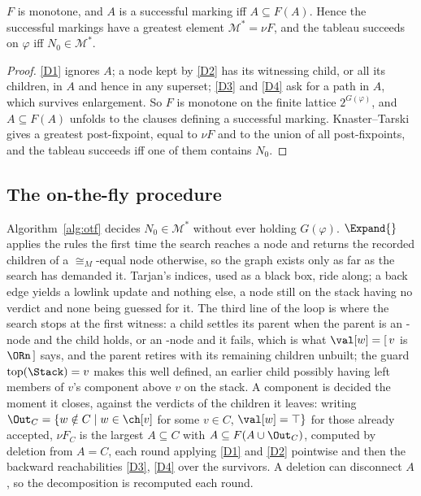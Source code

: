 \begin{proposition}\label{prop:gfp}
$F$ is monotone, and $A$ is a successful marking iff $A\subseteq F(A)$. Hence the successful markings
have a greatest element $\mathcal M^{*}=\nu F$, and the tableau succeeds on $\varphi$ iff
$N_0\in\mathcal M^{*}$.
\end{proposition}
\begin{proof}
\ref{D1} ignores $A$; a node kept by \ref{D2} has its witnessing child, or all its children, in $A$
and hence in any superset; \ref{D3} and \ref{D4} ask for a path in $A$, which survives enlargement.
So $F$ is monotone on the finite lattice $2^{G(\varphi)}$, and $A\subseteq F(A)$ unfolds to the
clauses defining a successful marking. Knaster--Tarski gives a greatest post-fixpoint, equal to $\nu
F$ and to the union of all post-fixpoints, and the tableau succeeds iff one of them contains $N_0$.
\end{proof}

\subsection{The on-the-fly procedure}\label{ss:otf}

Algorithm~\ref{alg:otf} decides $N_0\in\mathcal M^{*}$ without ever holding $G(\varphi)$.
$\Expand{}$ applies the rules the first time the search reaches a node and returns the recorded
children of a $\cong_M$-equal node otherwise, so the graph exists only as far as the search has
demanded it. Tarjan's indices, used as a black box, ride along; a back edge yields a lowlink update
and nothing else, a node still on the stack having no verdict and none being guessed for it. The
third line of the loop is where the search stops at the first witness: a child settles its parent
when the parent is an \ORn-node and the child holds, or an \ANDn-node and it fails, which is what
$\val[w]=[\,v$ is $\ORn\,]$ says, and the parent retires with its remaining children unbuilt; the guard $\mathrm{top}(\Stack)=v$ makes this well defined, an earlier child
possibly having left members of $v$'s component above $v$ on the stack. A component is decided the
moment it closes, against the verdicts of the children it leaves: writing
$\Out_C=\{w\notin C\mid w\in\ch[v]$ for some $v\in C$, $\val[w]=\top\}$ for those already accepted,
$\nu F_C$ is the largest $A\subseteq C$ with $A\subseteq F(A\cup\Out_C)$, computed by deletion from
$A=C$, each round applying \ref{D1} and \ref{D2} pointwise and then the backward reachabilities
\ref{D3}, \ref{D4} over the survivors. A deletion can disconnect $A$, so the decomposition is
recomputed each round.

